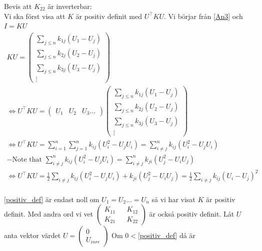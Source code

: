\documentclass{assignment}
\begin{document}
Bevis att $K_{22}$ är inverterbar: 
\\ 
Vi ska först visa att $K$ är positiv definit med $U^\top KU$.
Vi börjar från \cref{An3} och $I = KU$
\begin{align}
    \nonumber
    KU = 
    \begin{pmatrix}
        \sum_{j \leq n} k_{1j} (U_1-U_j)
        \\ \sum_{j\leq n} k_{2j} (U_2-U_j)
        \\ \sum_{j\leq n} k_{3j} (U_3-U_j)
        \\ \vdots
    \end{pmatrix}
    \\ \nonumber \Longleftrightarrow
    U^\top KU = 
    \begin{pmatrix}
        U_1 & U_2 & U_3 \dots
    \end{pmatrix}
    \begin{pmatrix}
        \sum_{j \leq n} k_{1j} (U_1-U_j)
        \\ \sum_{j\leq n} k_{2j} (U_2-U_j)
        \\ \sum_{j\leq n} k_{3j} (U_3-U_j)
        \\ \vdots
    \end{pmatrix}
    \\ \Longleftrightarrow
    U^\top KU = \sum_{i=1}^n\sum_{j=1}^n k_{ij}(U_i^2-U_jU_i) = \sum_{i\neq j}^n k_{ij} (U_i^2-U_jU_i)
    \\ \nonumber -\text{Note that $\sum_{i\neq j}^n k_{ij} (U_i^2-U_jU_i)= \sum_{i\neq j}^n k_{ji} (U_j^2-U_iU_j)$} 
    \\ \Longleftrightarrow U^\top KU =\frac{1}{2}\sum_{i\neq j}k_{ij}(U_i^2-U_jU_i)+k_{ji}(U_j^2-U_iU_j) =  \frac{1}{2}\sum_{i\neq j}k_{ij}(U_i-U_j)^2 \label{positiv_def}
\end{align}
\\ \cref{positiv_def} är endast noll om $U_1=U_2\dots = U_n$ så vi har visat $K$ är positiv definit. 
Med andra ord vi vet $
\begin{pmatrix}
    K_{11} && K_{12}
    \\ K_{21} && K_{22} 
\end{pmatrix}$ är också positiv definit. Låt $U$ anta vektor värdet $U = \begin{pmatrix}
    0
    \\ U_{inre}
\end{pmatrix}$
Om $0<$\cref{positiv_def} då är 
\end{document}
